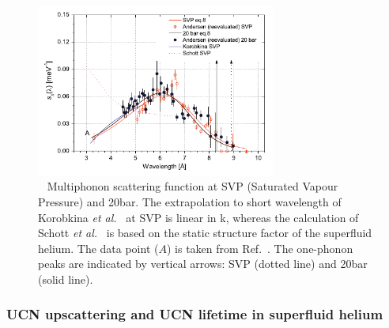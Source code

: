 \begin{figure}[h!]
\begin{center}
   \includegraphics[width=0.7\textwidth]{Schmidt_S.PNG}
    \caption{~\cite{Schmidt2009} Multiphonon scattering function
      at SVP (Saturated Vapour Pressure) and 20bar. The extrapolation
      to short wavelength of Korobkina {\it {et
          al.}}~\cite{Korobkina2002} at SVP is linear in k,
      whereas the calculation of Schott {\it {et
          al.}}~\cite{Schott2003} is based on the static structure
      factor of the superfluid helium. The data point ($A$) is taken
      from Ref.~\cite{Fak1991}. The one-phonon peaks are indicated
      by vertical arrows: SVP (dotted line) and 20bar (solid line).  }
    \label{fig:Schmidt_S}
    \end{center}
\end{figure} 






\subsubsection{UCN upscattering and UCN lifetime in superfluid helium~\cite{Leung2016}\label{sec:upscattering}}

